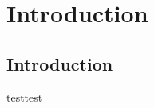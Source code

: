 \documentclass[buriama8_dp.tex]{subfiles}
\begin{document}
\chapter{Introduction}

\section{Introduction}

testtest
\end{document}
